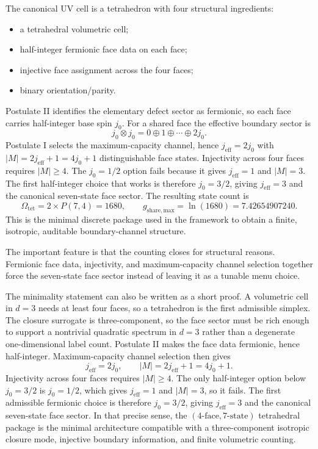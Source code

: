 \documentclass[11pt]{article}
\begin{document}
The canonical UV cell is a tetrahedron with four structural ingredients:
\begin{itemize}
\item a tetrahedral volumetric cell;
\item half-integer fermionic face data on each face;
\item injective face assignment across the four faces;
\item binary orientation/parity.
\end{itemize}
Postulate II identifies the elementary defect sector as fermionic, so each face carries half-integer base spin $j_0$. For a shared face the effective boundary sector is
\[
j_0\otimes j_0 = 0\oplus 1\oplus \cdots \oplus 2j_0.
\]
Postulate I selects the maximum-capacity channel, hence $j_{\mathrm{eff}}=2j_0$ with $|M|=2j_{\mathrm{eff}}+1=4j_0+1$ distinguishable face states. Injectivity across four faces requires $|M|\ge 4$. The $j_0=1/2$ option fails because it gives $j_{\mathrm{eff}}=1$ and $|M|=3$. The first half-integer choice that works is therefore $j_0=3/2$, giving $j_{\mathrm{eff}}=3$ and the canonical seven-state face sector.
The resulting state count is
\[
\Omega_{\mathrm{tet}}=2\times P(7,4)=1680,
\qquad
g_{\mathrm{share,max}}=\ln(1680)=7.42654907240.
\]
This is the minimal discrete package used in the framework to obtain a finite, isotropic, auditable boundary-channel structure.

The important feature is that the counting closes for structural reasons. Fermionic face data, injectivity, and maximum-capacity channel selection together force the seven-state face sector instead of leaving it as a tunable menu choice.

The minimality statement can also be written as a short proof. A volumetric cell in $d=3$ needs at least four faces, so a tetrahedron is the first admissible simplex. The closure surrogate is three-component, so the face sector must be rich enough to support a nontrivial quadratic spectrum in $d=3$ rather than a degenerate one-dimensional label count. Postulate II makes the face data fermionic, hence half-integer. Maximum-capacity channel selection then gives
\[
j_{\mathrm{eff}}=2j_0,
\qquad
|M|=2j_{\mathrm{eff}}+1=4j_0+1.
\]
Injectivity across four faces requires $|M|\ge 4$. The only half-integer option below $j_0=3/2$ is $j_0=1/2$, which gives $j_{\mathrm{eff}}=1$ and $|M|=3$, so it fails. The first admissible fermionic choice is therefore $j_0=3/2$, giving $j_{\mathrm{eff}}=3$ and the canonical seven-state face sector. In that precise sense, the $(4\text{-face},7\text{-state})$ tetrahedral package is the minimal architecture compatible with a three-component isotropic closure mode, injective boundary information, and finite volumetric counting.
\end{document}
